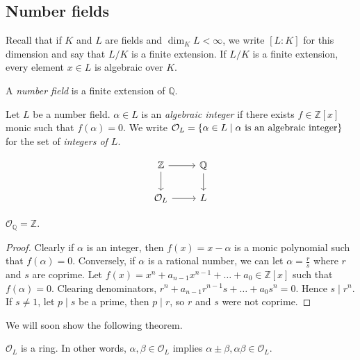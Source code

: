 \subsection{Number fields}
Recall that if \( K \) and \( L \) are fields and \( \dim_K L < \infty \), we write \( [L : K] \) for this dimension and say that \( L / K \) is a finite extension.
If \( L / K \) is a finite extension, every element \( x \in L \) is algebraic over \( K \).
\begin{definition}
    A \emph{number field} is a finite extension of \( \mathbb Q \).
\end{definition}
\begin{definition}
    Let \( L \) be a number field.
    \( \alpha \in L \) is an \emph{algebraic integer} if there exists \( f \in \mathbb Z[x] \) monic such that \( f(\alpha) = 0 \).
    We write \( \mathcal O_L = \qty{\alpha \in L \mid \alpha \text{ is an algebraic integer}} \) for the set of \emph{integers of \( L \)}.
\end{definition}
\[\begin{tikzcd}
	{\mathbb Z} & {\mathbb Q} \\
	{\mathcal O_L} & L
	\arrow[from=1-1, to=1-2]
	\arrow[from=1-2, to=2-2]
	\arrow[from=1-1, to=2-1]
	\arrow[from=2-1, to=2-2]
\end{tikzcd}\]
\begin{lemma}
    \( \mathcal O_{\mathbb Q} = \mathbb Z \).
\end{lemma}
\begin{proof}
    Clearly if \( \alpha \) is an integer, then \( f(x) = x - \alpha \) is a monic polynomial such that \( f(\alpha) = 0 \).
    Conversely, if \( \alpha \) is a rational number, we can let \( \alpha = \frac{r}{s} \) where \( r \) and \( s \) are coprime.
    Let \( f(x) = x^n + a_{n-1} x^{n-1} + \dots + a_0 \in \mathbb Z[x] \) such that \( f(\alpha) = 0 \).
    Clearing denominators, \( r^n + a_{n-1} r^{n-1} s + \dots + a_0 s^n = 0 \).
    Hence \( s \mid r^n \).
    If \( s \neq 1 \), let \( p \mid s \) be a prime, then \( p \mid r \), so \( r \) and \( s \) were not coprime.
\end{proof}
We will soon show the following theorem.
\begin{theorem}
    \( \mathcal O_L \) is a ring.
    In other words, \( \alpha, \beta \in \mathcal O_L \) implies \( \alpha \pm \beta, \alpha \beta \in \mathcal O_L \).
\end{theorem}

